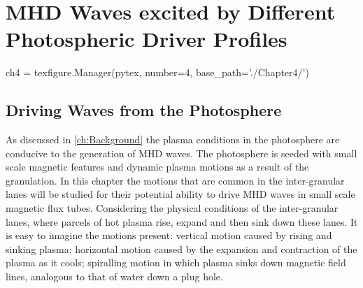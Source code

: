 
\chapter{MHD Waves excited by Different Photospheric Driver Profiles}

\begin{pycode}[chapter4]
ch4 = texfigure.Manager(pytex, number=4, base_path='./Chapter4/')
\end{pycode}


\section{Driving Waves from the Photosphere}\label{sec:5drivers}

As discussed in \cref{ch:Background} the plasma conditions in the photosphere are conducive to the generation of MHD waves.
The photosphere is seeded with small scale magnetic features and dynamic plasma motions as a result of the granulation.
In this chapter the motions that are common in the inter-granular lanes will be studied for their potential ability to drive MHD waves in small scale magnetic flux tubes.
Considering the physical conditions of the inter-granular lanes, where parcels of hot plasma rise, expand and then sink down these lanes.
It is easy to imagine the motions present: vertical motion caused by rising and sinking plasma; horizontal motion caused by the expansion and contraction of the plasma as it cools; spiralling motion in which plasma sinks down magnetic field lines, analogous to that of water down a plug hole.

